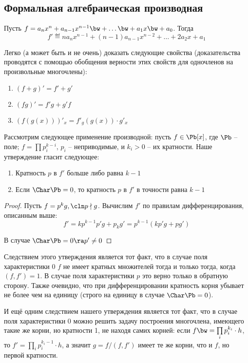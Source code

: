 \subsection{Формальная алгебраическая производная}

Пусть $f=a_nx^n+a_{n-1}x^{n-1}\bw+\dots\bw+a_1x\bw+a_0$. Тогда
$$f'\eqdef na_nx^{n-1}+(n-1)a_{n-1}x^{n-2}+\dots+2a_2x+a_1$$

Легко (а может быть и не очень) доказать следующие свойства (доказательства проводятся с помощью обобщения верности этих свойств для одночленов на произвольные многочлены):

\begin{enumerate}
  \item $(f+g)'=f'+g'$
  \item $(fg)'=f'g+g'f$
  \item $(f(g(x)))'_x=f'_g(g(x))\cdot g'_x$
\end{enumerate}

Рассмотрим следующее применение производной: пусть $f\in\Pb[x]$, где $\Pb$ -- поле; $f=\prod\limits p_i^{k-i}$, $p_i$ -- неприводимые, и $k_i>0$ -- их кратности. Наше утверждение гласит следующее:
\begin{theorem}
\begin{enumerate}
  \item Кратность $p$ в $f'$ больше либо равна $k-1$
  \item Если $\Char\Pb=0$, то кратность $p$ в $f'$ в точности равна $k-1$
\end{enumerate}
\end{theorem}
\begin{proof}
  Пусть $f=p^kg,\cln p\nmid g$. Вычислим $f'$ по правилам дифференцирования, описанным выше:
  $$f'=kp^{k-1}p'g+p_kg'=p^{k-1}(kp'g+pg')$$

  В случае $\Char\Pb=0\ra p'\ne0$
\end{proof}

Следствием этого утверждения является тот факт, что в случае поля характеристики 0 $f$ не имеет кратных множителей тогда и только тогда, когда $(f,f')=1$. В случае поля характеристики $p$ это верно только в обратную сторону. Также очевидно, что при дифференцировании кратность корня убывает не более чем на единицу (строго на единицу в случае $\Char\Pb=0$).

И ещё одним следствием нашего утверждения является тот факт, что в случае поля характеристики 0 можно решить задачу построения многочлена, имеющего такие же корни, но кратности 1, не находя самих корней: если $f\bw=\prod\limits_ip_i^{k_i}\cdot h$, то $f'=\prod\limits_ip_i^{k_i-1}\cdot h$, а значит $g=f/(f,f')$ имеет те же корни, что и $f$, но первой кратности.

